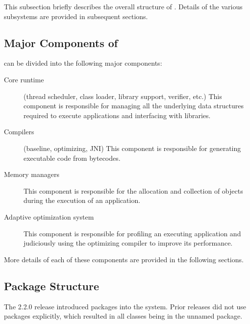 This subsection briefly describes the overall structure of \jrvm.
Details of the various subsystems are provided in subsequent
sections.  

\subsection{Major Components of \jrvm}


\jrvm{} can be divided into the following major components:
\begin{description}
\item[Core runtime] (thread scheduler, class loader, library support,
verifier, etc.) This component is responsible for 
managing all the underlying data
structures required to execute applications and interfacing with
libraries.

\item[Compilers] (baseline, optimizing, JNI) This component is
responsible for generating executable code from bytecodes.

\item[Memory managers] This component is responsible for the
allocation and collection of objects during the execution of an
application. 

\item[Adaptive optimization system] This component is responsible
for profiling an executing application
and judiciously using the optimizing compiler to
improve its performance.
\end{description}

More details of each of these components are provided in the following sections.

\subsection{Package Structure}
The 2.2.0 release introduced packages into the system.  Prior releases
did not use packages explicitly, which resulted in all classes being in
the unnamed package.  

